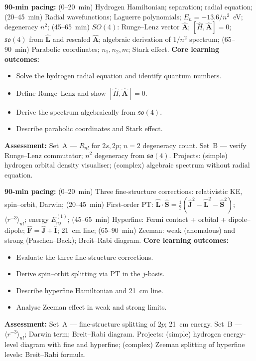 \documentclass[11pt,a4paper]{article}
\begin{document}
\medskip

\begin{tcolorbox}[modulebox, title={Module~II.3 --- Lecture L08: Hydrogen Atom and $SO(4)$ Symmetry}]
\textbf{90-min pacing:} (0--20~min) Hydrogen Hamiltonian; separation; radial equation; (20--45~min) Radial wavefunctions; Laguerre polynomials; $E_n=-13.6/n^2$~eV; degeneracy $n^2$; (45--65~min) $SO(4)$: Runge--Lenz vector $\hat{\mathbf{A}}$; $[\hat{H},\hat{\mathbf{A}}]=0$; $\mathfrak{so}(4)$ from $\hat{\mathbf{L}}$ and rescaled $\hat{\mathbf{A}}$; algebraic derivation of $1/n^2$ spectrum; (65--90~min) Parabolic coordinates; $n_1,n_2,m$; Stark effect.
\medskip\textbf{Core learning outcomes:}
\begin{itemize}[leftmargin=1.4em,topsep=2pt,itemsep=1pt]
  \item Solve the hydrogen radial equation and identify quantum numbers.
  \item Define Runge--Lenz and show $[\hat{H},\hat{\mathbf{A}}]=0$.
  \item Derive the spectrum algebraically from $\mathfrak{so}(4)$.
  \item Describe parabolic coordinates and Stark effect.
\end{itemize}
\medskip\textbf{Assessment:}
Set~A --- $R_{nl}$ for $2s,2p$; $n=2$ degeneracy count.
Set~B --- verify Runge--Lenz commutator; $n^2$ degeneracy from $\mathfrak{so}(4)$.
Projects: (simple) hydrogen orbital density visualiser; (complex) algebraic spectrum without radial equation.
\end{tcolorbox}

\medskip

\begin{tcolorbox}[modulebox, title={Module~II.3 --- Lecture L09: Fine and Hyperfine Structure}]
\textbf{90-min pacing:} (0--20~min) Three fine-structure corrections: relativistic KE, spin--orbit, Darwin; (20--45~min) First-order PT: $\hat{\mathbf{L}}\cdot\hat{\mathbf{S}}=\tfrac{1}{2}(\hat{\mathbf{J}}^2-\hat{\mathbf{L}}^2-\hat{\mathbf{S}}^2)$; $\langle r^{-3}\rangle_{nl}$; energy $E_{nj}^{(1)}$; (45--65~min) Hyperfine: Fermi contact + orbital + dipole--dipole; $\hat{\mathbf{F}}=\hat{\mathbf{J}}+\hat{\mathbf{I}}$; 21~cm line; (65--90~min) Zeeman: weak (anomalous) and strong (Paschen--Back); Breit--Rabi diagram.
\medskip\textbf{Core learning outcomes:}
\begin{itemize}[leftmargin=1.4em,topsep=2pt,itemsep=1pt]
  \item Evaluate the three fine-structure corrections.
  \item Derive spin--orbit splitting via PT in the $j$-basis.
  \item Describe hyperfine Hamiltonian and 21~cm line.
  \item Analyse Zeeman effect in weak and strong limits.
\end{itemize}
\medskip\textbf{Assessment:}
Set~A --- fine-structure splitting of $2p$; 21~cm energy.
Set~B --- $\langle r^{-3}\rangle_{nl}$; Darwin term; Breit--Rabi diagram.
Projects: (simple) hydrogen energy-level diagram with fine and hyperfine; (complex) Zeeman splitting of hyperfine levels: Breit--Rabi formula.
\end{tcolorbox}
\end{document}
